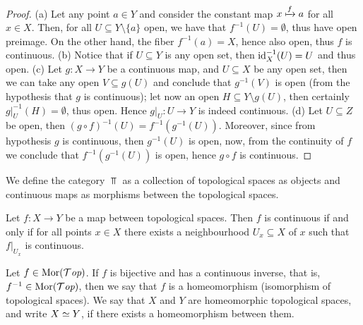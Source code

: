 \begin{proof}
  (a) Let any point \(a \in Y\) and consider the constant map \(x \xmapsto f a\)
  for all \(x \in X\). Then, for all \(U \subseteq Y \setminus \{a\}\) open, we
  have that \(f^{-1}(U) = \emptyset\), thus have open preimage. On the other
  hand, the fiber \(f^{-1}(a) = X\), hence also open, thus \(f\) is continuous.
  (b) Notice that if \(U \subseteq Y\) is any open set, then \(\operatorname{id}_X^{-1}(U) =
  U\) and thus open.
  (c) Let \(g : X \to Y\) be a continuous map, and \(U \subseteq X\) be any open
  set, then we can take any open \(V \subseteq g(U)\) and conclude that
  \(g^{-1}(V)\) is open (from the hypothesis that \(g\) is continuous); let now
  an open \(H \subseteq Y \setminus g(U)\), then certainly \(g|_U^{-1}(H) =
  \emptyset\), thus open. Hence \(g|_U : U \to Y\) is indeed continuous.
  (d) Let \(U \subseteq Z\) be open, then \((g \circ f)^{-1}(U) = f^{-1}
  (g^{-1}(U))\). Moreover, since from hypothesis \(g\) is continuous, then
  \(g^{-1}(U)\) is open, now, from the continuity of \(f\) we conclude that
  \(f^{-1}(g^{-1}(U))\) is open, hence \(g \circ f\) is continuous.
\end{proof}

\begin{definition}
  We define the category \(\Top\) as a collection of topological spaces as
  objects and continuous maps as morphisms between the topological spaces.
\end{definition}

\begin{proposition}
  \label{prop: local criterion for continuity}
  Let \(f: X \to Y\) be a map between topological spaces. Then \(f\) is
  continuous if and only if for all points \(x \in X\) there exists a
  neighbourhood \(U_x \subseteq X\) of \(x\) such that \(f|_{U_x}\) is
  continuous.
\end{proposition}


\begin{definition}[Homeomorphism]\label{def: homeomorphism}
  Let \(f \in \operatorname{Mor}({\mathcal{T}\textit{op}})\). If \(f\) is bijective and has a continuous
  inverse, that is, \(f^{-1} \in \operatorname{Mor}({\mathcal{T}\textit{op}})\), then we say that \(f\) is a
  homeomorphism (isomorphism of topological spaces). We say that \(X\) and
  \(Y\) are homeomorphic topological spaces, and write \(X \simeq Y\), if there
  exists a homeomorphism between them.
\end{definition}


